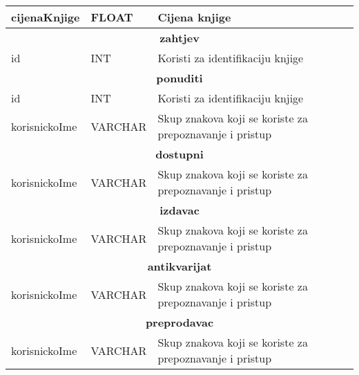 \documentclass{article}
\begin{document}
\begin{tabular}{ |p{4cm}|p{3cm}|p{5cm}|  }
		\hline
		cijenaKnjige & FLOAT & Cijena knjige\\
		\hline
		\hline
		\multicolumn{3}{|c|}{\textbf{zahtjev}} \\
		\bottomrule[2pt]
		\cellcolor{blue!10}id & INT &Koristi za identifikaciju knjige\\
		\hline
		\hline
		\multicolumn{3}{|c|}{\textbf{ponuditi}} \\
		\bottomrule[2pt]
		\cellcolor{blue!10}id & INT & Koristi za identifikaciju knjige\\
		\hline
		\cellcolor{blue!10}korisnickoIme & VARCHAR & Skup znakova koji se koriste za prepoznavanje i pristup\\
		\hline
		\hline
		\multicolumn{3}{|c|}{\textbf{dostupni}} \\
		\bottomrule[2pt]
		\cellcolor{blue!10}korisnickoIme & VARCHAR & Skup znakova koji se koriste za prepoznavanje i pristup\\
		\hline
		\hline
		\multicolumn{3}{|c|}{\textbf{izdavac}} \\
		\bottomrule[2pt]
		\cellcolor{blue!10}korisnickoIme & VARCHAR & Skup znakova koji se koriste za prepoznavanje i pristup\\
		\hline
		\hline
		\multicolumn{3}{|c|}{\textbf{antikvarijat}} \\
		\bottomrule[2pt]
		\cellcolor{blue!10}korisnickoIme & VARCHAR & Skup znakova koji se koriste za prepoznavanje i pristup\\
		\hline
		\hline
		\multicolumn{3}{|c|}{\textbf{preprodavac}} \\
		\bottomrule[2pt]
		\cellcolor{blue!10}korisnickoIme & VARCHAR & Skup znakova koji se koriste za prepoznavanje i pristup\\
		\hline
	\end{tabular}
\end{document}
